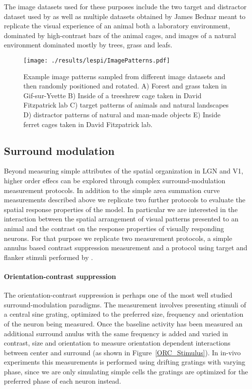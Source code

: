 The image datasets used for these purposes include the two target and
distractor dataset used by \cite{Serre2007} as well as multiple
datasets obtained by James Bednar meant to replicate the visual
experience of an animal both a laboratory environment, dominated by
high-contrast bars of the animal cages, and images of a natural
environment dominated mostly by trees, grass and leafs.

\begin{figure}
	\centering
	\texttt{[image: ./results/lespi/ImagePatterns.pdf]}
	\caption[Example image patterns used to train the model] {Example
      image patterns sampled from different image datasets and then
      randomly positioned and rotated. A) Forest and grass taken in
      Gif-sur-Yvette B) Inside of a treeshrew cage taken in David
      Fitzpatrick lab C) \cite{Serre07} target patterns of animals and
      natural landscapes D) \cite{Serre07} distractor patterns of
      natural and man-made objects E) Inside ferret cages taken in
      David Fitzpatrick lab.}
    \label{image_patterns}
\end{figure}

\subsection{Surround modulation}

Beyond measuring simple attributes of the spatial organization in LGN
and V1, higher order effecs can be explored through complex 
surround-modulation measurement protocols. In addition to the simple area
summation curve measurements described above we replicate two further
protocols to evaluate the spatial response properties of the model.
In particular we are interested in the interaction between the spatial
arrangement of visual patterns presented to an animal and the contrast
on the response properties of visually responding neurons. For that
purpose we replicate two measurement protocols, a simple annulus based
contrast suppression measurement \cite{Jones2002} and a protocol using
target and flanker stimuli performed by \cite{Kapadia1995}.

\paragraph{Orientation-contrast suppression}

The orientation-contrast suppression is perhaps one of the most well
studied surround-modulation paradigms. The measurement involves
presenting stimuli of a central sine grating, optimized to the
preferred size, frequency and orientation of the neuron being
measured. Once the baseline activity has been measured an additional
surround anulus with the same frequency is added and varied in
contrast, size and orientation to measure orientation dependent
interactions between center and surround (as shown in
Figure~\ref{ORC_Stimulus}). In in-vivo experiments this measurements
is performed using drifting gratings with varying phase, since we are
only simulating simple cells the gratings are optimized for the
preferred phase of each neuron instead.

